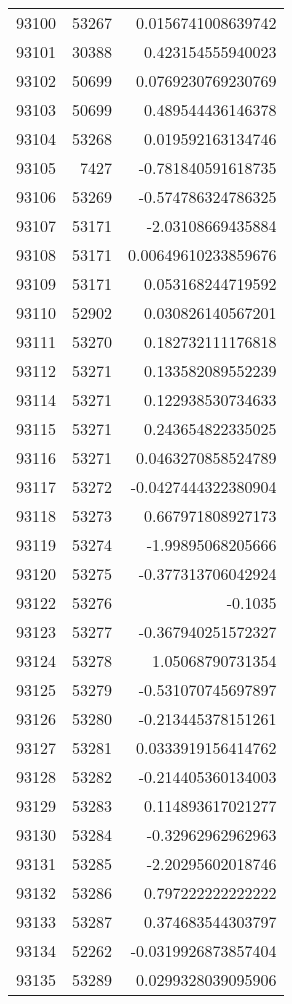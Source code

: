 \begin{tabular}{r | r | r}
93100 & 53267 & 0.0156741008639742 \\
93101 & 30388 & 0.423154555940023 \\
93102 & 50699 & 0.0769230769230769 \\
93103 & 50699 & 0.489544436146378 \\
93104 & 53268 & 0.019592163134746 \\
93105 & 7427 & -0.781840591618735 \\
93106 & 53269 & -0.574786324786325 \\
93107 & 53171 & -2.03108669435884 \\
93108 & 53171 & 0.00649610233859676 \\
93109 & 53171 & 0.053168244719592 \\
93110 & 52902 & 0.030826140567201 \\
93111 & 53270 & 0.182732111176818 \\
93112 & 53271 & 0.133582089552239 \\
93114 & 53271 & 0.122938530734633 \\
93115 & 53271 & 0.243654822335025 \\
93116 & 53271 & 0.0463270858524789 \\
93117 & 53272 & -0.0427444322380904 \\
93118 & 53273 & 0.667971808927173 \\
93119 & 53274 & -1.99895068205666 \\
93120 & 53275 & -0.377313706042924 \\
93122 & 53276 & -0.1035 \\
93123 & 53277 & -0.367940251572327 \\
93124 & 53278 & 1.05068790731354 \\
93125 & 53279 & -0.531070745697897 \\
93126 & 53280 & -0.213445378151261 \\
93127 & 53281 & 0.0333919156414762 \\
93128 & 53282 & -0.214405360134003 \\
93129 & 53283 & 0.114893617021277 \\
93130 & 53284 & -0.32962962962963 \\
93131 & 53285 & -2.20295602018746 \\
93132 & 53286 & 0.797222222222222 \\
93133 & 53287 & 0.374683544303797 \\
93134 & 52262 & -0.0319926873857404 \\
93135 & 53289 & 0.0299328039095906 \\

\end{tabular}

